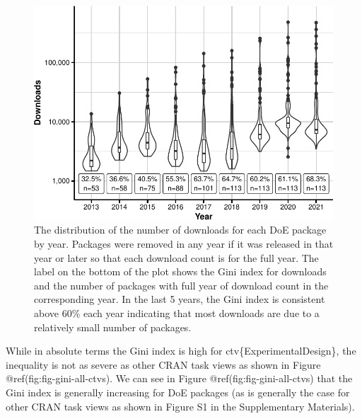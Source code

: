\documentclass{article}
\begin{document}
\begin{figure}[htbp]

{\centering \includegraphics{figures/download-share-1} 

}

\caption{The distribution of the number of downloads for each DoE package by year. Packages were removed in any year if it was released in that year or later so that each download count is for the full year. The label on the bottom of the plot shows the Gini index for downloads and the number of packages with full year of download count in the corresponding year. In the last 5 years, the Gini index is consistent above 60\% each year indicating that most downloads are due to a relatively small number of packages.}\label{fig:download-share}
\end{figure}

While in absolute terms the Gini index is high for
ctv\{ExperimentalDesign\}, the inequality is not as severe as other CRAN
task views as shown in Figure @ref(fig:fig-gini-all-ctvs). We can see in
Figure @ref(fig:fig-gini-all-ctvs) that the Gini index is generally
increasing for DoE packages (as is generally the case for other CRAN
task views as shown in Figure S1 in the Supplementary Materials).
\end{document}
